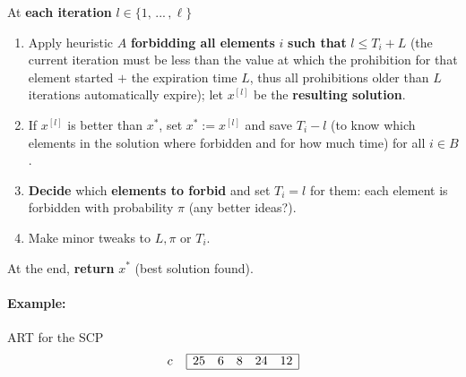 At \textbf{each iteration} $l \in \{1, \, ... \, , \ell \}$
\begin{enumerate}
	\item Apply heuristic $A$ \textbf{forbidding all elements} $i$ \textbf{such that} $l \leq T_i + L$ (the current iteration must be less than the value at which the prohibition for that element started $+$ the expiration time $L$, thus all prohibitions older than $L$ iterations automatically expire); let $x^{[l]}$ be the \textbf{resulting solution}.\\
	
	\item If $x^{[l]}$ is better than $x^\ast$, set $x^\ast := x^{[l]}$ and save $T_i - l$ (to know which elements in the solution where forbidden and for how much time) for all $i \in B$.\\
	
	\item \textbf{Decide} which \textbf{elements to forbid} and set $T_i = l$ for them: each element is forbidden with probability $\pi$ (any better ideas?).\\
	
	\item Make minor tweaks to $L, \pi$ or $T_i$.\\
\end{enumerate}

At the end, \textbf{return} $x^\ast$ (best solution found).\\

\newpage

\paragraph{Example:} ART for the SCP 
$$
c \;\;\;\;
\begin{array}{| c c c c c |}
	\hline
	25 & 6 & 8 & 24 & 12 \\
	\hline
\end{array}
$$

